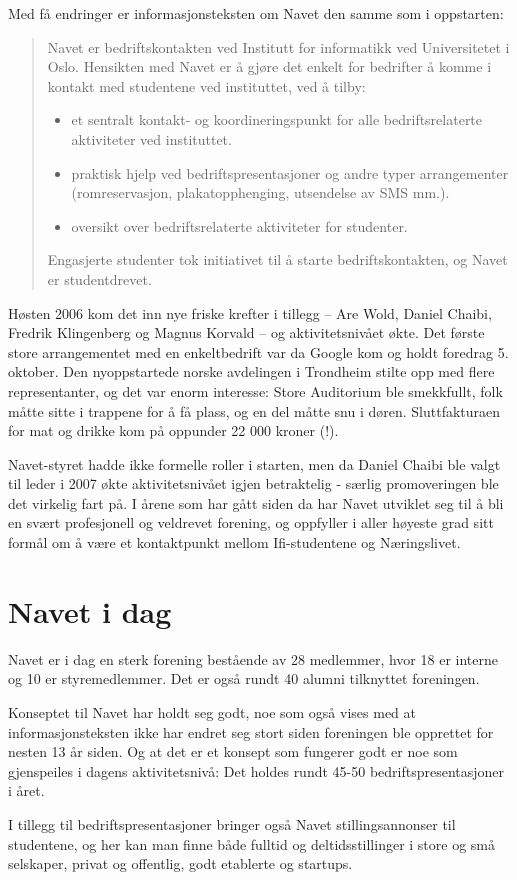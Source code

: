 Med få endringer er informasjonsteksten om Navet den samme som i oppstarten:

\begin{quote}
	Navet er bedriftskontakten ved Institutt for informatikk ved Universitetet i Oslo. Hensikten med Navet er å gjøre det enkelt for bedrifter å komme i kontakt med studentene ved instituttet, ved å tilby:
	
	\begin{itemize}
		\item et sentralt kontakt- og koordineringspunkt for alle bedriftsrelaterte aktiviteter ved instituttet.
		\item praktisk hjelp ved bedriftspresentasjoner og andre typer arrangementer (romreservasjon, plakatopphenging, utsendelse av SMS mm.).
		\item oversikt over bedriftsrelaterte aktiviteter for studenter.
	\end{itemize}
	
	Engasjerte studenter tok initiativet til å starte bedriftskontakten, og Navet er studentdrevet.
\end{quote}

Høsten 2006 kom det inn nye friske krefter i tillegg -- Are Wold, Daniel Chaibi, Fredrik Klingenberg og Magnus Korvald -- og aktivitetsnivået økte. Det første store arrangementet med en enkeltbedrift var da Google kom og holdt foredrag 5. oktober. Den nyoppstartede norske avdelingen i Trondheim stilte opp med flere representanter, og det var enorm interesse: Store Auditorium ble smekkfullt, folk måtte sitte i trappene for å få plass, og en del måtte snu i døren. Sluttfakturaen for mat og drikke kom på oppunder 22 000 kroner (!).

Navet-styret hadde ikke formelle roller i starten, men da Daniel Chaibi ble valgt til leder i 2007 økte aktivitetsnivået igjen betraktelig - særlig promoveringen ble det virkelig fart på. I årene som har gått siden da har Navet utviklet seg til å bli en svært profesjonell og veldrevet forening, og oppfyller i aller høyeste grad sitt formål om å være et kontaktpunkt mellom Ifi-studentene og Næringslivet.

\section{Navet i dag}

\author{Skrevet av Carl-Magnus Lein, nåværende leder}

Navet er i dag en sterk forening bestående av 28 medlemmer, hvor 18 er interne og 10 er styremedlemmer. Det er også rundt 40 alumni tilknyttet foreningen.

Konseptet til Navet har holdt seg godt, noe som også vises med at informasjonsteksten ikke har endret seg stort siden foreningen ble opprettet for nesten 13 år siden. Og at det er et konsept som fungerer godt er noe som gjenspeiles i dagens aktivitetsnivå: Det holdes rundt 45-50 bedriftspresentasjoner i året.

I tillegg til bedriftspresentasjoner bringer også Navet stillingsannonser til studentene, og her kan man finne både fulltid og deltidsstillinger i store og små selskaper, privat og offentlig, godt etablerte og startups.
